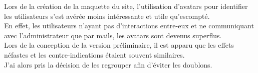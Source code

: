 Lors de la création de la maquette du site, l'utilisation d'avatars pour identifier les utilisateurs s'est avérée moins intéressante et utile qu'escompté.\\
En effet, les utilisateurs n'ayant pas d'interactions entre-eux et ne communiquant avec l'administrateur que par mails, les avatars sont devenus superflus.\\

Lors de la conception de la version préliminaire, il est apparu que les effets néfastes et les contre-indications étaient souvent similaires.\\
J'ai alors pris la décision de les regrouper afin d'éviter les doublons.

